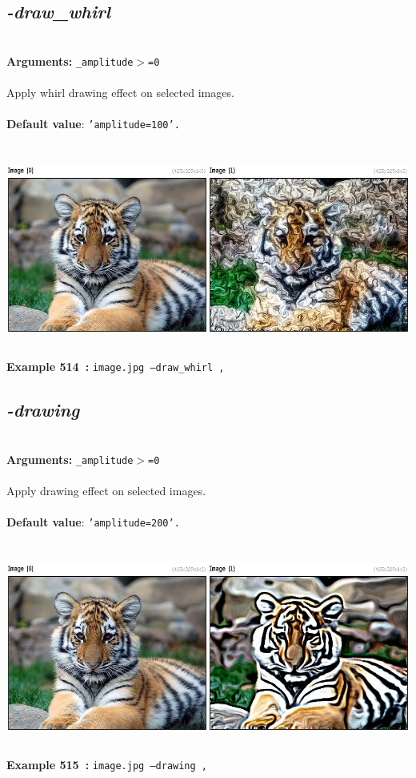 \documentclass[a4paper,11pt,twoside]{book}
\begin{document}
\subsection{\emph{-draw\_whirl} }\vspace*{-0.5em}
~\\\textbf{Arguments: } 
{\small \texttt{\_amplitude$>$=0}}\\~\\
Apply whirl drawing effect on selected images.
~\\~\\\textbf{Default value}: {\small \texttt{'amplitude=100'.}}
\begin{center}\includegraphics[keepaspectratio=true,height=7cm,width=\textwidth]{img/gmic_def514.jpg}\\
{\footnotesize \textbf{Example 514~:} \texttt{image.jpg --draw\_whirl ,}}
\end{center}

\subsection{\emph{-drawing} }\vspace*{-0.5em}
~\\\textbf{Arguments: } 
{\small \texttt{\_amplitude$>$=0}}\\~\\
Apply drawing effect on selected images.
~\\~\\\textbf{Default value}: {\small \texttt{'amplitude=200'.}}
\begin{center}\includegraphics[keepaspectratio=true,height=7cm,width=\textwidth]{img/gmic_def515.jpg}\\
{\footnotesize \textbf{Example 515~:} \texttt{image.jpg --drawing ,}}
\end{center}
\end{document}
